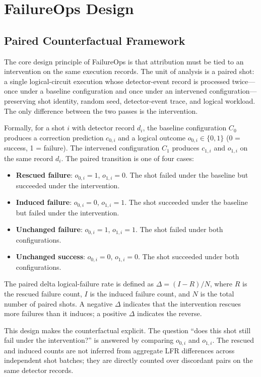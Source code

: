 \section{FailureOps Design}

\subsection{Paired Counterfactual Framework}

The core design principle of FailureOps is that attribution must be tied to an intervention on the same execution records. The unit of analysis is a paired shot: a single logical-circuit execution whose detector-event record is processed twice---once under a baseline configuration and once under an intervened configuration---preserving shot identity, random seed, detector-event trace, and logical workload. The only difference between the two passes is the intervention.

Formally, for a shot $i$ with detector record $d_i$, the baseline configuration $C_0$ produces a correction prediction $c_{0,i}$ and a logical outcome $o_{0,i} \in \{0, 1\}$ (0 = success, 1 = failure). The intervened configuration $C_1$ produces $c_{1,i}$ and $o_{1,i}$ on the same record $d_i$. The paired transition is one of four cases:

\begin{itemize}
\item \textbf{Rescued failure}: $o_{0,i} = 1$, $o_{1,i} = 0$. The shot failed under the baseline but succeeded under the intervention.
\item \textbf{Induced failure}: $o_{0,i} = 0$, $o_{1,i} = 1$. The shot succeeded under the baseline but failed under the intervention.
\item \textbf{Unchanged failure}: $o_{0,i} = 1$, $o_{1,i} = 1$. The shot failed under both configurations.
\item \textbf{Unchanged success}: $o_{0,i} = 0$, $o_{1,i} = 0$. The shot succeeded under both configurations.
\end{itemize}

The paired delta logical-failure rate is defined as $\Delta = (I - R) / N$, where $R$ is the rescued failure count, $I$ is the induced failure count, and $N$ is the total number of paired shots. A negative $\Delta$ indicates that the intervention rescues more failures than it induces; a positive $\Delta$ indicates the reverse.

This design makes the counterfactual explicit. The question ``does this shot still fail under the intervention?'' is answered by comparing $o_{0,i}$ and $o_{1,i}$. The rescued and induced counts are not inferred from aggregate LFR differences across independent shot batches; they are directly counted over discordant pairs on the same detector records.

